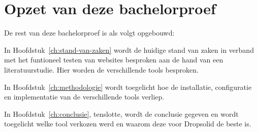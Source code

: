 
\section{Opzet van deze bachelorproef}
\label{sec:opzet-bachelorproef}


De rest van deze bachelorproef is als volgt opgebouwd:

In Hoofdstuk~\ref{ch:stand-van-zaken} wordt de huidige stand van zaken in verband met het funtioneel testen van websites besproken aan de hand van een literatuurstudie. Hier worden de verschillende \glspl{tool} besproken.

In Hoofdstuk~\ref{ch:methodologie} wordt toegelicht hoe de installatie, configuratie en implementatie van de verschillende \glspl{tool} verliep.


In Hoofdstuk~\ref{ch:conclusie}, tenslotte, wordt de conclusie gegeven en wordt toegelicht welke \gls{tool} verkozen werd en waarom deze voor Dropsolid de beste is.

